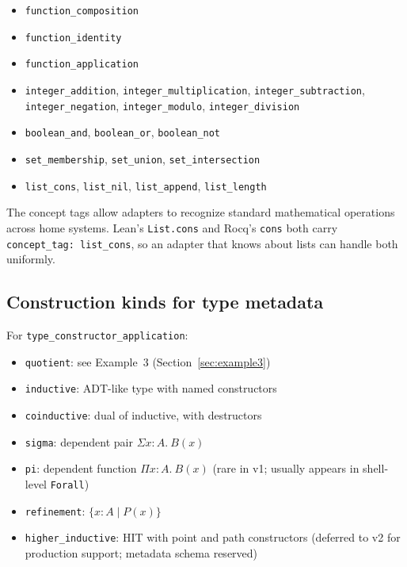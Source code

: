 \documentclass[11pt,letterpaper]{article}
\theoremstyle{definition}
\theoremstyle{remark}
\begin{document}
\begin{itemize}[leftmargin=2em]
  \item \texttt{function\_composition}
  \item \texttt{function\_identity}
  \item \texttt{function\_application}
  \item \texttt{integer\_addition}, \texttt{integer\_multiplication},
        \texttt{integer\_subtraction}, \texttt{integer\_negation},
        \texttt{integer\_modulo}, \texttt{integer\_division}
  \item \texttt{boolean\_and}, \texttt{boolean\_or}, \texttt{boolean\_not}
  \item \texttt{set\_membership}, \texttt{set\_union}, \texttt{set\_intersection}
  \item \texttt{list\_cons}, \texttt{list\_nil}, \texttt{list\_append},
        \texttt{list\_length}
\end{itemize}

The concept tags allow adapters to recognize standard mathematical
operations across home systems. Lean's \texttt{List.cons} and Rocq's
\texttt{cons} both carry \texttt{concept\_tag: list\_cons}, so an
adapter that knows about lists can handle both uniformly.

\subsection{Construction kinds for type metadata}
\label{app:construction-kinds}

For \texttt{type\_constructor\_application}:

\begin{itemize}[leftmargin=2em]
  \item \texttt{quotient}: see Example~3 (Section~\ref{sec:example3})
  \item \texttt{inductive}: ADT-like type with named constructors
  \item \texttt{coinductive}: dual of inductive, with destructors
  \item \texttt{sigma}: dependent pair $\Sigma x : A.\ B(x)$
  \item \texttt{pi}: dependent function $\Pi x : A.\ B(x)$ (rare in
        v1; usually appears in shell-level \texttt{Forall})
  \item \texttt{refinement}: $\{x : A \mid P(x)\}$
  \item \texttt{higher\_inductive}: HIT with point and path constructors
        (deferred to v2 for production support; metadata schema reserved)
\end{itemize}
\end{document}
